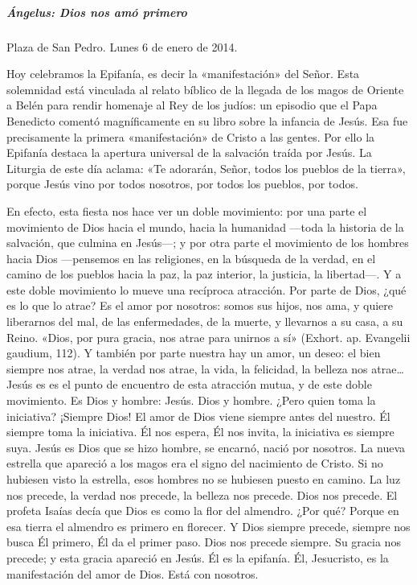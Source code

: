 \documentclass[]{article}
\let\oldsubparagraph\subparagraph
\renewcommand{\subparagraph}[1]{\oldsubparagraph{#1}\mbox{}}
\begin{document}
\subparagraph{Ángelus: Dios nos amó
primero}\label{uxe1ngelus-dios-nos-amuxf3-primero}

Plaza de San Pedro. Lunes 6 de enero de 2014.

Hoy celebramos la Epifanía, es decir la «manifestación» del Señor. Esta
solemnidad está vinculada al relato bíblico de la llegada de los magos
de Oriente a Belén para rendir homenaje al Rey de los judíos: un
episodio que el Papa Benedicto comentó magníficamente en su libro sobre
la infancia de Jesús. Esa fue precisamente la primera «manifestación» de
Cristo a las gentes. Por ello la Epifanía destaca la apertura universal
de la salvación traída por Jesús. La Liturgia de este día aclama: «Te
adorarán, Señor, todos los pueblos de la tierra», porque Jesús vino por
todos nosotros, por todos los pueblos, por todos.

En efecto, esta fiesta nos hace ver un doble movimiento: por una parte
el movimiento de Dios hacia el mundo, hacia la humanidad ---toda la
historia de la salvación, que culmina en Jesús---; y por otra parte el
movimiento de los hombres hacia Dios ---pensemos en las religiones, en
la búsqueda de la verdad, en el camino de los pueblos hacia la paz, la
paz interior, la justicia, la libertad---. Y a este doble movimiento lo
mueve una recíproca atracción. Por parte de Dios, ¿qué es lo que lo
atrae? Es el amor por nosotros: somos sus hijos, nos ama, y quiere
liberarnos del mal, de las enfermedades, de la muerte, y llevarnos a su
casa, a su Reino. «Dios, por pura gracia, nos atrae para unirnos a sí»
(Exhort. ap. Evangelii gaudium, 112). Y también por parte nuestra hay un
amor, un deseo: el bien siempre nos atrae, la verdad nos atrae, la vida,
la felicidad, la belleza nos atrae\ldots{} Jesús es es el punto de
encuentro de esta atracción mutua, y de este doble movimiento. Es Dios y
hombre: Jesús. Dios y hombre. ¿Pero quien toma la iniciativa? ¡Siempre
Dios! El amor de Dios viene siempre antes del nuestro. Él siempre toma
la iniciativa. Él nos espera, Él nos invita, la iniciativa es siempre
suya. Jesús es Dios que se hizo hombre, se encarnó, nació por nosotros.
La nueva estrella que apareció a los magos era el signo del nacimiento
de Cristo. Si no hubiesen visto la estrella, esos hombres no se hubiesen
puesto en camino. La luz nos precede, la verdad nos precede, la belleza
nos precede. Dios nos precede. El profeta Isaías decía que Dios es como
la flor del almendro. ¿Por qué? Porque en esa tierra el almendro es
primero en florecer. Y Dios siempre precede, siempre nos busca Él
primero, Él da el primer paso. Dios nos precede siempre. Su gracia nos
precede; y esta gracia apareció en Jesús. Él es la epifanía. Él,
Jesucristo, es la manifestación del amor de Dios. Está con nosotros.
\end{document}

